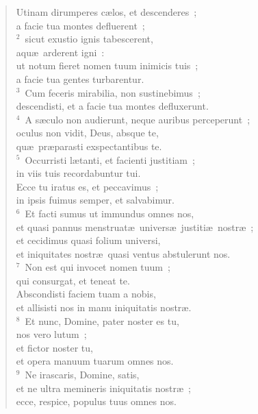 \begin{flushleft}\begin{verse}\vspace{-19pt}\hspace{6pt}Utinam dirumperes c\ae los, et descenderes~;\\\hspace{6pt} a facie tua montes defluerent~;\\
${}^{2}$~sicut exustio ignis tabescerent,\\ aqu\ae\ arderent igni~:\\ ut notum fieret nomen tuum inimicis tuis~;\\ a facie tua gentes turbarentur.\\
${}^{3}$~Cum feceris mirabilia, non sustinebimus~;\\ descendisti, et a facie tua montes defluxerunt.\\
${}^{4}$~A s\ae culo non audierunt, neque auribus perceperunt~;\\ oculus non vidit, Deus, absque te,\\ qu\ae\ pr\ae parasti exspectantibus te.\\
${}^{5}$~Occurristi l\ae tanti, et facienti justitiam~;\\ in viis tuis recordabuntur tui.\\ Ecce tu iratus es, et peccavimus~;\\ in ipsis fuimus semper, et salvabimur.\\
${}^{6}$~Et facti sumus ut immundus omnes nos,\\ et quasi pannus menstruat\ae\ univers\ae\ justiti\ae\ nostr\ae~;\\ et cecidimus quasi folium universi,\\ et iniquitates nostr\ae\ quasi ventus abstulerunt nos.\\
${}^{7}$~Non est qui invocet nomen tuum~;\\ qui consurgat, et teneat te.\\ Abscondisti faciem tuam a nobis,\\ et allisisti nos in manu iniquitatis nostr\ae .\\
${}^{8}$~Et nunc, Domine, pater noster es tu,\\ nos vero lutum~;\\ et fictor noster tu,\\ et opera manuum tuarum omnes nos.\\
${}^{9}$~Ne irascaris, Domine, satis,\\ et ne ultra memineris iniquitatis nostr\ae~;\\ ecce, respice, populus tuus omnes nos.\\

\end{verse}
\end{flushleft}

